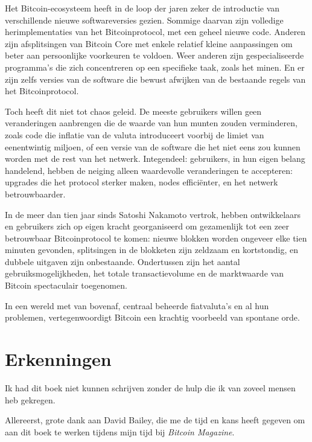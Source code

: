 \documentclass[
  a5paper,
  smalldemyvopaper,11pt,twoside,onecolumn,openright,extrafontsizes,
hidelinks]{memoir}
\begin{document}
Het Bitcoin-ecosysteem heeft in de loop der jaren zeker de introductie
van verschillende nieuwe softwareversies gezien. Sommige daarvan zijn
volledige herimplementaties van het Bitcoinprotocol, met een geheel
nieuwe code. Anderen zijn afsplitsingen van Bitcoin Core met enkele
relatief kleine aanpassingen om beter aan persoonlijke voorkeuren te
voldoen. Weer anderen zijn gespecialiseerde programma's die zich
concentreren op een specifieke taak, zoals het minen. En er zijn zelfs
versies van de software die bewust afwijken van de bestaande regels van
het Bitcoinprotocol.

Toch heeft dit niet tot chaos geleid. De meeste gebruikers willen geen
veranderingen aanbrengen die de waarde van hun munten zouden
verminderen, zoals code die inflatie van de valuta introduceert voorbij
de limiet van eenentwintig miljoen, of een versie van de software die
het niet eens zou kunnen worden met de rest van het netwerk.
Integendeel: gebruikers, in hun eigen belang handelend, hebben de
neiging alleen waardevolle veranderingen te accepteren: upgrades die het
protocol sterker maken, nodes efficiënter, en het netwerk
betrouwbaarder.

In de meer dan tien jaar sinds Satoshi Nakamoto vertrok, hebben
ontwikkelaars en gebruikers zich op eigen kracht georganiseerd om
gezamenlijk tot een zeer betrouwbaar Bitcoinprotocol te komen: nieuwe
blokken worden ongeveer elke tien minuten gevonden, splitsingen in de
blokketen zijn zeldzaam en kortstondig, en dubbele uitgaven zijn
onbestaande. Ondertussen zijn het aantal gebruiksmogelijkheden, het
totale transactievolume en de marktwaarde van Bitcoin spectaculair
toegenomen.

In een wereld met van bovenaf, centraal beheerde fiatvaluta's en al hun
problemen, vertegenwoordigt Bitcoin een krachtig voorbeeld van spontane
orde.

\backmatter


\chapter*{Erkenningen}\label{erkenningen}


Ik had dit boek niet kunnen schrijven zonder de hulp die ik van zoveel
mensen heb gekregen.

Allereerst, grote dank aan David Bailey, die me de tijd en kans heeft
gegeven om aan dit boek te werken tijdens mijn tijd bij \emph{Bitcoin
Magazine}.
\end{document}
